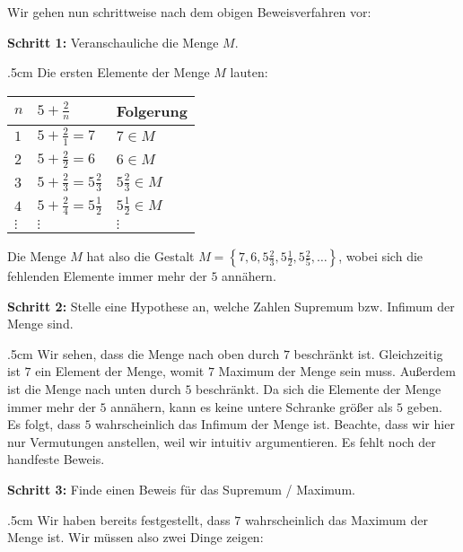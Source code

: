 \documentclass[fontsize=9pt,
               parskip=half-,
               DIV=14,
               listof=chapterentry,
               tocflat]{scrbook}
\newenvironment{indentblock}{\begin{adjustwidth}{.5cm}{}}{\end{adjustwidth}}
\newcommand{\proofstep}[1]{\textbf{\textcolor{sblau}{#1}}}
\begin{document}
\begin{solutionprocess*}
Wir gehen nun schrittweise nach dem obigen Beweisverfahren vor:

\proofstep{Schritt 1:}
 Veranschauliche die Menge $M$.\begin{indentblock}
Die ersten Elemente der Menge $M$ lauten:


\renewcommand{\arraystretch}{1.5}

\begin{longtabu} to \linewidth {X[l]X[l]X[l]} \\ \toprule 
$n$ & $5+{\tfrac {2}{n}}$ & Folgerung \\ 
\midrule
$1$ & $5+{\tfrac {2}{1}}=7$ & $7\in M$ \\ 
$2$ & $5+{\tfrac {2}{2}}=6$ & $6\in M$ \\ 
$3$ & $5+{\tfrac {2}{3}}=5{\tfrac {2}{3}}$ & $5{\tfrac {2}{3}}\in M$ \\ 
$4$ & $5+{\tfrac {2}{4}}=5{\tfrac {1}{2}}$ & $5{\tfrac {1}{2}}\in M$ \\ 
$\vdots $ & $\vdots $ & $\vdots $ \\ 
\bottomrule
\end{longtabu}
\renewcommand{\arraystretch}{1.0}
Die Menge $M$ hat also die Gestalt $M=\left\{7,6,5{\tfrac {2}{3}},5{\tfrac {1}{2}},5{\tfrac {2}{5}},\dots \right\}$, wobei sich die fehlenden Elemente immer mehr der $5$ annähern.

\end{indentblock}

\proofstep{Schritt 2:}
 Stelle eine Hypothese an, welche Zahlen Supremum bzw. Infimum der Menge sind.\begin{indentblock}
Wir sehen, dass die Menge nach oben durch $7$ beschränkt ist. Gleichzeitig ist $7$ ein Element der Menge, womit $7$ Maximum der Menge sein muss. Außerdem ist die Menge nach unten durch $5$ beschränkt. Da sich die Elemente der Menge immer mehr der $5$ annähern, kann es keine untere Schranke größer als $5$ geben. Es folgt, dass $5$ wahrscheinlich das Infimum der Menge ist. Beachte, dass wir hier nur Vermutungen anstellen, weil wir intuitiv argumentieren. Es fehlt noch der handfeste Beweis.

\end{indentblock}

\proofstep{Schritt 3:}
 Finde einen Beweis für das Supremum / Maximum.\begin{indentblock}
Wir haben bereits festgestellt, dass $7$ wahrscheinlich das Maximum der Menge ist. Wir müssen also zwei Dinge zeigen:


\end{indentblock}
\end{solutionprocess*}
\end{document}
